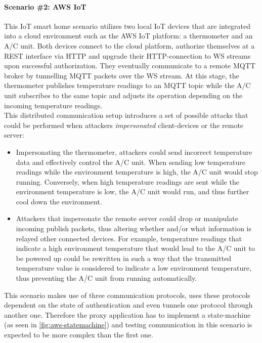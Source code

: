\paragraph{Scenario \#2: \ac{AWS} \ac{IoT}} This \ac{IoT} smart home scenario utilizes two local \ac{IoT} devices that are integrated into a cloud environment such as the \ac{AWS} \ac{IoT} platform: a thermometer and an \ac{A/C} unit. Both devices connect to the cloud platform, authorize themselves at a \ac{REST} interface via \ac{HTTP} and upgrade their \ac{HTTP}-connection to \ac{WS} streams upon successful authorization. They eventually communicate to a remote \ac{MQTT} broker by tunnelling \ac{MQTT} packets over the \ac{WS} stream. At this stage, the thermometer publishes temperature readings to an \ac{MQTT} topic while the \ac{A/C} unit subscribes to the same topic and adjusts its operation depending on the incoming temperature readings. \\
This distributed communication setup introduces a set of possible attacks that could be performed when attackers \emph{impersonated} client-devices or the remote server:
\begin{itemize}
    \item Impersonating the thermometer, attackers could send incorrect temperature data and effectively control the \ac{A/C} unit. When sending low temperature readings while the environment temperature is high, the \ac{A/C} unit would stop running. Conversely, when high temperature readings are sent while the environment temperature is low, the \ac{A/C} unit would run, and thus further cool down the environment.
    \item Attackers that impersonate the remote server could drop or manipulate incoming publish packets, thus altering whether and/or what information is relayed other connected devices. For example, temperature readings that indicate a high environment temperature that would lead to the \ac{A/C} unit to be powered up could be rewritten in such a way that the transmitted temperature value is considered to indicate a low environment temperature, thus preventing the \ac{A/C} unit from running automatically.
\end{itemize}
This scenario makes use of three communication protocols, uses these protocols dependent on the state of authentication and even tunnels one protocol through another one. Therefore the proxy application has to implement a state-machine (as seen in \ref{fig:aws-statemachine}) and testing communication in this scenario is expected to be more complex than the first one. %

